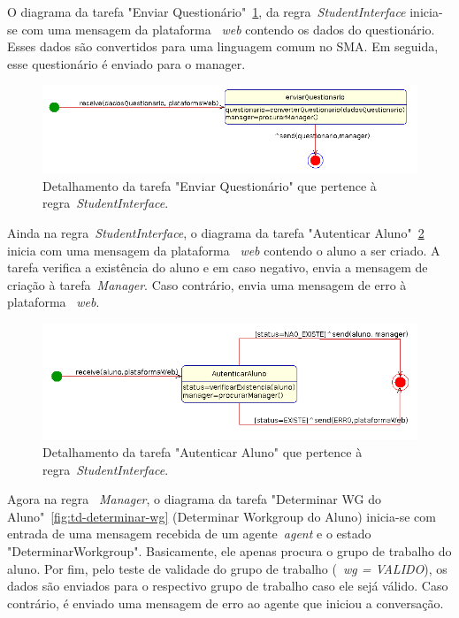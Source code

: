 O diagrama da tarefa "Enviar Questionário"~\ref{fig:td-enviar-quest}, da regra~\emph{StudentInterface} inicia-se com uma mensagem da plataforma ~\emph{web} contendo os dados do questionário. Esses dados são convertidos para uma linguagem comum no SMA. Em seguida, esse questionário é enviado para o manager.

\begin{figure}
	\centering
	\includegraphics[scale=0.48]{images/td-enviar-quest.png}
	\caption{Detalhamento da tarefa "Enviar Questionário" que pertence à regra~\emph{StudentInterface}.}
	\label{fig:td-enviar-quest}
\end{figure}

Ainda na regra~\emph{StudentInterface}, o diagrama da tarefa "Autenticar Aluno"~\ref{fig:td-autenticar-aluno} inicia com uma mensagem da plataforma ~\emph{web} contendo o aluno a ser criado. A tarefa verifica a existência do aluno e em caso negativo, envia a mensagem de criação à tarefa~\emph{Manager}. Caso contrário, envia uma mensagem de erro à plataforma ~\emph{web}.

\begin{figure}
	\centering
	\includegraphics[scale=0.48]{images/td-autenticar-aluno.png}
	\caption{Detalhamento da tarefa "Autenticar Aluno" que pertence à regra~\emph{StudentInterface}.}
	\label{fig:td-autenticar-aluno}
\end{figure}

Agora na regra ~\emph{Manager}, o diagrama da tarefa "Determinar WG do Aluno"~\ref{fig:td-determinar-wg} (Determinar Workgroup do Aluno) inicia-se com entrada de uma mensagem recebida de um agente~\emph{agent} e o estado "DeterminarWorkgroup". Basicamente, ele apenas procura o grupo de trabalho do aluno. Por fim, pelo teste de validade do grupo de trabalho (~\emph{wg = VALIDO}), os dados são enviados para o respectivo grupo de trabalho caso ele sejá válido. Caso contrário, é enviado uma mensagem de erro ao agente que iniciou a conversação.

